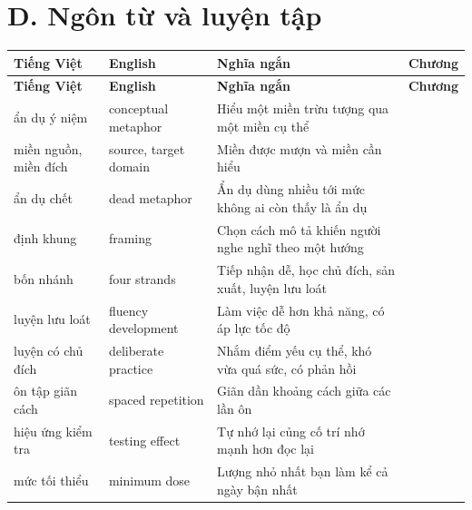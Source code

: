 \documentclass[english.tex]{subfiles}
\begin{document}
\section*{D. Ngôn từ và luyện tập}
\begin{center}\footnotesize
{}
\begin{longtable}{@{}L{3.4cm}L{3.8cm}L{6.6cm}L{1.5cm}@{}}
\toprule
\textbf{Tiếng Việt} & \textbf{English} & \textbf{Nghĩa ngắn} & \textbf{Chương}\\
\midrule
\endfirsthead
\toprule
\textbf{Tiếng Việt} & \textbf{English} & \textbf{Nghĩa ngắn} & \textbf{Chương}\\
\midrule
\endhead
ẩn dụ ý niệm & conceptual metaphor & Hiểu một miền trừu tượng qua một miền cụ thể & \\
miền nguồn, miền đích & source, target domain & Miền được mượn và miền cần hiểu & \\
ẩn dụ chết & dead metaphor & Ẩn dụ dùng nhiều tới mức không ai còn thấy là ẩn dụ & \\
định khung & framing & Chọn cách mô tả khiến người nghe nghĩ theo một hướng & \\
bốn nhánh & four strands & Tiếp nhận dễ, học chủ đích, sản xuất, luyện lưu loát & \\
luyện lưu loát & fluency development & Làm việc dễ hơn khả năng, có áp lực tốc độ & \\
luyện có chủ đích & deliberate practice & Nhắm điểm yếu cụ thể, khó vừa quá sức, có phản hồi & \\
ôn tập giãn cách & spaced repetition & Giãn dần khoảng cách giữa các lần ôn & \\
hiệu ứng kiểm tra & testing effect & Tự nhớ lại củng cố trí nhớ mạnh hơn đọc lại & \\
mức tối thiểu & minimum dose & Lượng nhỏ nhất bạn làm kể cả ngày bận nhất & \\
\bottomrule
\end{longtable}
\end{center}
\end{document}
